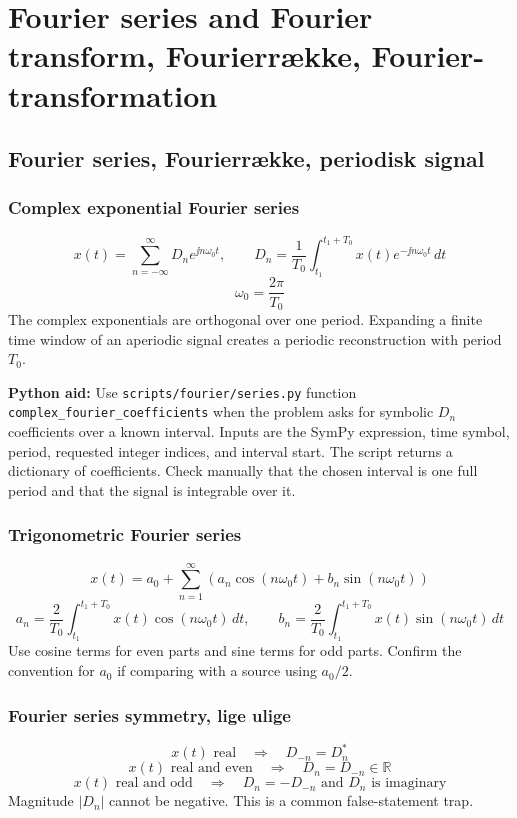 \section{Fourier series and Fourier transform, Fourierrække, Fourier-transformation}

\subsection{Fourier series, Fourierrække, periodisk signal}

\subsubsection{Complex exponential Fourier series}
\[
x(t)=\sum_{n=-\infty}^{\infty}D_n e^{\jj n\omega_0t},\qquad
D_n=\frac{1}{T_0}\int_{t_1}^{t_1+T_0}x(t)e^{-\jj n\omega_0t}\,dt
\]
\[
\omega_0=\frac{2\pi}{T_0}
\]
The complex exponentials are orthogonal over one period. Expanding a finite time window of an aperiodic signal creates a periodic reconstruction with period \(T_0\).

\textbf{Python aid:} Use \texttt{scripts/fourier/series.py} function \texttt{complex\_fourier\_coefficients} when the problem asks for symbolic \(D_n\) coefficients over a known interval. Inputs are the SymPy expression, time symbol, period, requested integer indices, and interval start. The script returns a dictionary of coefficients. Check manually that the chosen interval is one full period and that the signal is integrable over it.

\subsubsection{Trigonometric Fourier series}
\[
x(t)=a_0+\sum_{n=1}^{\infty}\left(a_n\cos(n\omega_0t)+b_n\sin(n\omega_0t)\right)
\]
\[
a_n=\frac{2}{T_0}\int_{t_1}^{t_1+T_0}x(t)\cos(n\omega_0t)\,dt,\qquad
b_n=\frac{2}{T_0}\int_{t_1}^{t_1+T_0}x(t)\sin(n\omega_0t)\,dt
\]
Use cosine terms for even parts and sine terms for odd parts. Confirm the convention for \(a_0\) if comparing with a source using \(a_0/2\).

\subsubsection{Fourier series symmetry, lige ulige}
\[
x(t)\text{ real}\quad\Rightarrow\quad D_{-n}=D_n^*
\]
\[
x(t)\text{ real and even}\quad\Rightarrow\quad D_n=D_{-n}\in\mathbb{R}
\]
\[
x(t)\text{ real and odd}\quad\Rightarrow\quad D_n=-D_{-n}\text{ and }D_n\text{ is imaginary}
\]
Magnitude \(|D_n|\) cannot be negative. This is a common false-statement trap.

